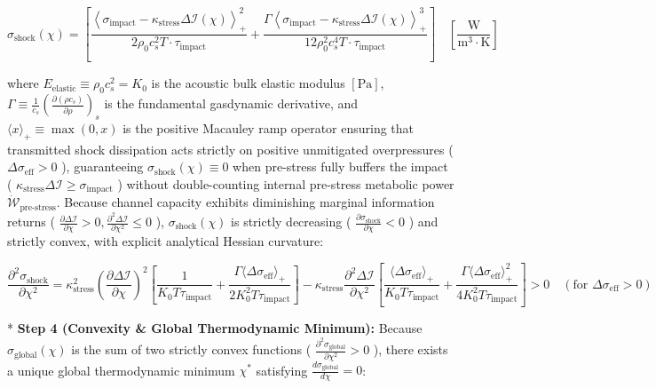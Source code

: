 \documentclass[11pt,a4paper]{article}
\theoremstyle{definition}
\theoremstyle{remark}
\begin{document}
\begin{equation}
\boxed{\sigma_{\text{shock}}(\chi) = [ \frac{\left\langle \sigma_{\text{impact}} - \kappa_{\text{stress}} \Delta \mathcal{I}(\chi) \right\rangle_+^2}{2 \rho_0 c_s^2 T \cdot \tau_{\text{impact}}} + \frac{\Gamma \left\langle \sigma_{\text{impact}} - \kappa_{\text{stress}} \Delta \mathcal{I}(\chi) \right\rangle_+^3}{12 \rho_0^2 c_s^4 T \cdot \tau_{\text{impact}}} ] \quad [\frac{\mathrm{W}}{\mathrm{m^3 \cdot K}}]}
\end{equation}


where $E_{\text{elastic}} \equiv \rho_0 c_s^2 = K_0$ is the acoustic bulk elastic modulus $[\mathrm{Pa}]$, $\Gamma \equiv \frac{1}{c_s} \left( \frac{\partial(\rho c_s)}{\partial \rho} \right)_s$ is the fundamental gasdynamic derivative, and $\langle x \rangle_+ \equiv \max(0, x)$ is the positive Macauley ramp operator ensuring that transmitted shock dissipation acts strictly on positive unmitigated overpressures ( $\Delta \sigma_{\text{eff}} > 0$ ), guaranteeing $\sigma_{\text{shock}}(\chi) \equiv 0$ when pre-stress fully buffers the impact ( $\kappa_{\text{stress}}\Delta\mathcal{I} \ge \sigma_{\text{impact}}$ ) without double-counting internal pre-stress metabolic power $\dot{\mathcal{W}}_{\text{pre-stress}}$.
Because channel capacity exhibits diminishing marginal information returns ( $\frac{\partial \Delta \mathcal{I}}{\partial \chi} > 0, \frac{\partial^2 \Delta \mathcal{I}}{\partial \chi^2} \le 0$ ), $\sigma_{\text{shock}}(\chi)$ is strictly decreasing ( $\frac{\partial \sigma_{\text{shock}}}{\partial \chi} < 0$ ) and strictly convex, with explicit analytical Hessian curvature:


\begin{equation}
\boxed{\frac{\partial^2 \sigma_{\text{shock}}}{\partial \chi^2} = \kappa_{\text{stress}}^2 \left(\frac{\partial \Delta \mathcal{I}}{\partial \chi}\right)^2 [ \frac{1}{K_0 T \tau_{\text{impact}}} + \frac{\Gamma \langle \Delta \sigma_{\text{eff}} \rangle_+}{2 K_0^2 T \tau_{\text{impact}}} ] - \kappa_{\text{stress}} \frac{\partial^2 \Delta \mathcal{I}}{\partial \chi^2} [ \frac{\langle \Delta \sigma_{\text{eff}} \rangle_+}{K_0 T \tau_{\text{impact}}} + \frac{\Gamma \langle \Delta \sigma_{\text{eff}} \rangle_+^2}{4 K_0^2 T \tau_{\text{impact}}} ] > 0 \quad (\text{for } \Delta \sigma_{\text{eff}} > 0)}
\end{equation}


* \textbf{Step 4 (Convexity \& Global Thermodynamic Minimum):}
Because $\sigma_{\text{global}}(\chi)$ is the sum of two strictly convex functions ( $\frac{\partial^2 \sigma_{\text{global}}}{\partial \chi^2} > 0$ ), there exists a unique global thermodynamic minimum $\chi^*$ satisfying $\frac{d\sigma_{\text{global}}}{d\chi} = 0$:
\end{document}

